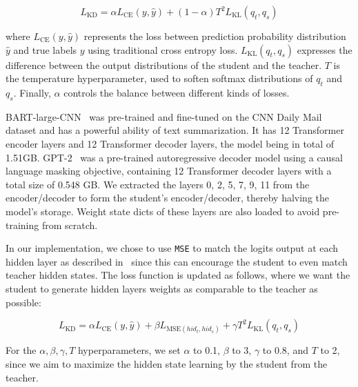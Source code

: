 \begin{equation}
    L_{\text{KD}} = \alpha L_{\text{CE}}(y, \hat{y}) + (1 - \alpha) T^2 L_{\text{KL}}(q_t, q_s)
    \label{eq:kd-loss}
\end{equation}

where $L_{\text{CE}}(y, \hat{y})$ represents the loss between prediction probability distribution $\hat{y}$ and true labels $y$ using traditional cross entropy loss.
$L_{\text{KL}}(q_t, q_s)$ expresses the difference between the output distributions of the student and the teacher.
$T$ is the temperature hyperparameter, used to soften softmax distributions of $q_t$ and $q_s$.
Finally, $\alpha$ controls the balance between different kinds of losses.

BART-large-CNN~\cite{lewis2019bart} was pre-trained and fine-tuned on the CNN Daily Mail dataset and has a powerful ability of text summarization.
It has 12 Transformer encoder layers and 12 Transformer decoder layers, the model being in total of 1.51GB\@.
GPT-2~\cite{radford2019language} was a pre-trained autoregressive decoder model using a causal language masking objective,
containing 12 Transformer decoder layers with a total size of 0.548 GB. We extracted the layers 0, 2, 5, 7, 9, 11
from the encoder/decoder to form the student's encoder/decoder, thereby halving the model's storage.
Weight state dicts of these layers are also loaded to avoid pre-training from scratch.

In our implementation, we chose to use \texttt{MSE} to match the logits output at each hidden layer
as described in~\cite{shleifer2020pre} since this can encourage the student to even match teacher hidden states.
The loss function is updated as follows,
where we want the student to generate hidden layers weights as comparable to the teacher as possible:

\begin{equation}
    L_{\text{KD}} = \alpha L_{\text{CE}}(y, \hat{y}) + \beta L_{\text{MSE}(hid_t, hid_s)} + \gamma T^2 L_{\text{KL}}(q_t, q_s)
    \label{eq:kdmse-loss}
\end{equation}

For the $\alpha, \beta, \gamma, T$ hyperparameters, we set $\alpha$ to 0.1, $\beta$ to 3, $\gamma$ to 0.8,
and $T$ to 2, since we aim to maximize the hidden state learning by the student from the teacher.

